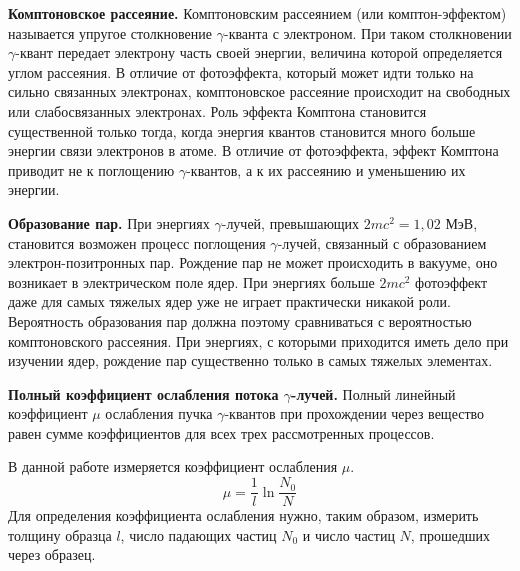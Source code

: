 	
	
	
	\textbf{Комптоновское рассеяние.} Комптоновским рассеянием (или комптон-эффектом) называется упругое столкновение $\gamma$-кванта с электроном. При таком столкновении $\gamma$-квант передает электрону часть своей энергии, величина которой определяется углом рассеяния. В отличие от фотоэффекта, который может идти только на сильно связанных электронах, комптоновское рассеяние происходит на свободных или слабосвязанных электронах. Роль эффекта Комптона становится существенной только тогда, когда энергия квантов становится много больше энергии связи электронов в атоме. В отличие от фотоэффекта, эффект Комптона приводит не к поглощению $\gamma$-квантов, а к их рассеянию и уменьшению их энергии.

	
	
	\textbf{Образование пар.} При энергиях $\gamma$-лучей, превышающих $2mc^2 = 1,02$ МэВ, становится возможен процесс поглощения $\gamma$-лучей, связанный с образованием электрон-позитронных пар. Рождение пар не может происходить в вакууме, оно возникает в электрическом поле ядер. При энергиях больше $2mc^2$ фотоэффект даже для самых тяжелых ядер уже не играет практически никакой роли. Вероятность образования пар должна поэтому сравниваться с вероятностью комптоновского рассеяния. При энергиях, с которыми приходится иметь дело при изучении ядер, рождение пар существенно только в самых тяжелых элементах.
	
	
	\textbf{Полный коэффициент ослабления потока $\gamma$-лучей.} Полный линейный коэффициент $\mu$ ослабления пучка $\gamma$-квантов при прохождении через вещество равен сумме коэффициентов для всех трех рассмотренных процессов.
	
	
	
	В данной работе измеряется коэффициент ослабления $\mu$.
	\begin{equation}
		\mu = \frac{1}{l} \ln \frac{N_0}{N}
	\end{equation}
	Для определения коэффициента ослабления нужно, таким образом, измерить толщину образца $l$, число падающих частиц $N_0$ и число частиц $N$, прошедших через образец.
	
